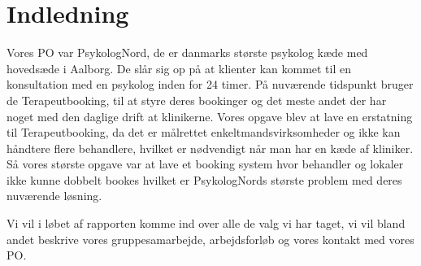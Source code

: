 \section{Indledning}
Vores PO var PsykologNord, de er danmarks største psykolog kæde med hovedsæde i Aalborg. De slår sig op på at klienter kan kommet til en konsultation med en psykolog inden for 24 timer. På nuværende tidspunkt bruger de Terapeutbooking, til at styre deres bookinger og det meste andet der har noget med den daglige drift at klinikerne. Vores opgave blev at lave en erstatning til Terapeutbooking, da det er målrettet enkeltmandsvirksomheder og ikke kan håndtere flere behandlere, hvilket er nødvendigt når man har en kæde af kliniker. Så vores største opgave var at lave et booking system hvor behandler og lokaler ikke kunne dobbelt bookes hvilket er PsykologNords største problem med deres nuværende løsning.

Vi vil i løbet af rapporten komme ind over alle de valg vi har taget, vi vil bland andet beskrive vores gruppesamarbejde, arbejdsforløb og vores kontakt med vores PO.
